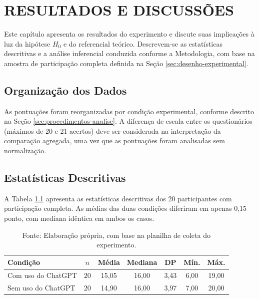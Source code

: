 
\chapter{RESULTADOS E DISCUSSÕES}
\label{chap:resultados}

Este capítulo apresenta os resultados do experimento e discute suas implicações à luz da hipótese $H_{0}$ e do referencial teórico. Descrevem-se as estatísticas descritivas e a análise inferencial conduzida conforme a Metodologia, com base na amostra de participação completa definida na Seção \ref{sec:desenho-experimental}.

\section{Organização dos Dados}
\label{sec:organizacao-dados}

As pontuações foram reorganizadas por condição experimental, conforme descrito na Seção \ref{sec:procedimentos-analise}. A diferença de escala entre os questionários (máximos de 20 e 21 acertos) deve ser considerada na interpretação da comparação agregada, uma vez que as pontuações foram analisadas sem normalização.

\section{Estatísticas Descritivas}
\label{sec:desempenho-condicoes}

A Tabela \ref{tab:estatisticas-descritivas} apresenta as estatísticas descritivas dos 20 participantes com participação completa. As médias das duas condições diferiram em apenas 0,15 ponto, com mediana idêntica em ambos os casos.

\begin{table}[!ht]
    \centering
    \caption{Estatísticas descritivas do desempenho nos questionários}
    \label{tab:estatisticas-descritivas}
    \begin{tabular}{l c c c c c c}
        \hline
        \textbf{Condição} & \textbf{$n$} & \textbf{Média} & \textbf{Mediana} & \textbf{DP} & \textbf{Mín.} & \textbf{Máx.} \\
        \hline
        Com uso do ChatGPT & 20 & 15,05 & 16,00 & 3,43 & 6,00 & 19,00 \\
        Sem uso do ChatGPT & 20 & 14,90 & 16,00 & 3,97 & 7,00 & 20,00 \\
        \hline
    \end{tabular}

    \vspace{0.2cm}
    \caption*{Fonte: Elaboração própria, com base na planilha de coleta do experimento.}
\end{table}

